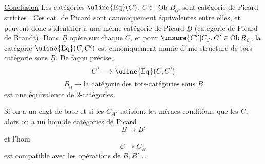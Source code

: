 
\uline{Conclusion} Les catégories $\uline{\operatorname{Eq}}(C)$,
$C\in\operatorname{Ob}\underline B_0$, sont
catégorie de Picard \uline{strictes}
.
Ces cat. de Picard sont \uline{canoniquement} équivalentes entre elles,
et peuvent donc s'identifier à une même catégorie de Picard
$\underline B$ (catégorie de Picard de \uline{Brandt}).
Donc $\underline B$ opère sur chaque $C$, et pour
$\unsure{C''|C},C'\in\operatorname{Ob}\underline B_0$,
la catégorie 
$\uline{\operatorname{Eq}}(C,C')$ est canoniquement munie d'une structure
de tors-catégorie sous $\underline B$. De façon précise,
\[
C'\longmapsto\uline{\operatorname{Eq}}(C,C')
\]
\[
\underline B_0\longrightarrow
\text{la catégorie des tors-catégories sous }\underline B
\]
est une équivalence de $2$-catégories.

Si on a un chgt de base
et si les $C_{A'}$ satisfont les mêmes conditions que les $C$,
alors on a un hom de  catégories de Picard
\[
\underline B\longrightarrow\underline B'
\]
et l'hom 
\[
C\longrightarrow C_{A'}
\]
est compatible avec les opérations de $\underline B,\underline B'$ \ldots
